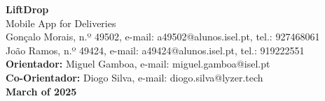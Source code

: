 \documentclass[a4paper,twoside,11pt]{article}
\begin{document}

\vspace{-15mm}
\begin{figure}[h]
\begin{center}
\end{center}
\end{figure}
\vspace{-8mm}

\begin{center}
    \LARGE \textbf{LiftDrop} \\ %
    \LARGE Mobile App for Deliveries \\ %
    \vspace{8mm}
    \large Gonçalo Morais, n.º 49502, e-mail: a49502@alunos.isel.pt, tel.: 927468061 \\
    \vspace{1mm}
    \large João Ramos, n.º 49424, e-mail: a49424@alunos.isel.pt, tel.: 919222551 \\
    \vspace{5mm}
    \large \textbf{Orientador:} Miguel Gamboa, e-mail: miguel.gamboa@isel.pt \\
    \vspace{3mm}
    \large \textbf{Co-Orientador:} Diogo Silva, e-mail: diogo.silva@lyzer.tech \\
    \vspace{5mm}
    \textbf{March of 2025}
\end{center}

\newpage
\null
\newpage
\end{document}
